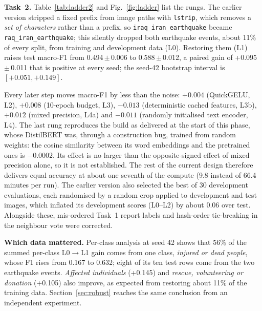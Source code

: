 \documentclass[conference]{IEEEtran}
\newcommand{\pmse}[2]{#1\,$\pm$\,#2}
\begin{document}
\textbf{Task~2.} Table~\ref{tab:ladder2} and Fig.~\ref{fig:ladder} list the rungs. The earlier version stripped a fixed prefix from image paths with \texttt{lstrip}, which removes a \emph{set of characters} rather than a prefix, so \texttt{iraq\_iran\_earthquake} became \texttt{raq\_iran\_earthquake}; this silently dropped both earthquake events, about 11\% of every split, from training and development data (L0). Restoring them (L1) raises test macro-F1 from \pmse{0.494}{0.006} to \pmse{0.588}{0.012}, a paired gain of \pmse{+0.095}{0.011} that is positive at every seed; the seed-42 bootstrap interval is $[+0.051, +0.149]$.

Every later step moves macro-F1 by less than the noise: $+0.004$ (QuickGELU, L2), $+0.008$ (10-epoch budget, L3), $-0.013$ (deterministic cached features, L3b), $+0.012$ (mixed precision, L4a) and $-0.011$ (randomly initialised text encoder, L4). The last rung reproduces the build as delivered at the start of this phase, whose DistilBERT was, through a construction bug, trained from random weights: the cosine similarity between its word embeddings and the pretrained ones is $-0.0002$. Its effect is no larger than the opposite-signed effect of mixed precision alone, so it is not established. The rest of the current design therefore delivers equal accuracy at about one seventh of the compute (9.8 instead of 66.4 minutes per run). The earlier version also selected the best of 30 development evaluations, each randomised by a random crop applied to development and test images, which inflated its development scores (L0--L2) by about 0.06 over test. Alongside these, mis-ordered Task~1 report labels and hash-order tie-breaking in the neighbour vote were corrected.

\textbf{Which data mattered.} Per-class analysis at seed 42 shows that 56\% of the summed per-class L0$\rightarrow$L1 gain comes from one class, \emph{injured or dead people}, whose F1 rises from 0.167 to 0.632; eight of its ten test rows come from the two earthquake events. \emph{Affected individuals} (+0.145) and \emph{rescue, volunteering or donation} (+0.105) also improve, as expected from restoring about 11\% of the training data. Section~\ref{sec:robust} reaches the same conclusion from an independent experiment.
\end{document}

